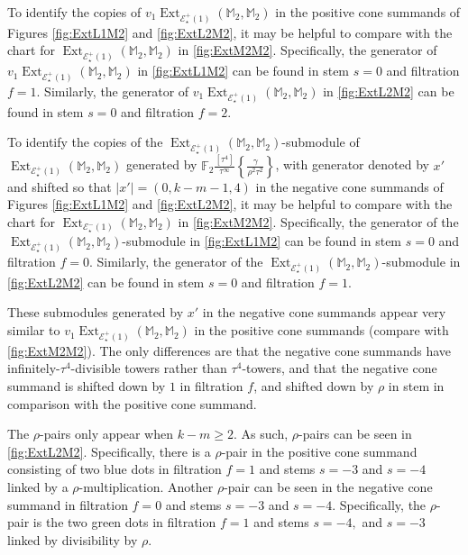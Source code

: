 \documentclass{amsart}
\theoremstyle{plain}
\numberwithin{equation}{section}
\numberwithin{figure}{section}
\DeclareMathOperator{\Ext}{Ext}
\newcommand{\mF}{{\mathbb F}}
\newcommand{\mM}{{\mathbb M}}
\newcommand{\cE}{{\mathcal E}}
\newcommand{\0}{\langle 0 \rangle }
\begin{document}
To identify the copies of $v_{1}\Ext_{\cE^{+}_{\star}(1)}(\mM_{2}, \mM_{2})$ in the positive cone summands of Figures \ref{fig:ExtL1M2} and \ref{fig:ExtL2M2}, it may be helpful to compare with the chart for $\Ext_{\cE^{+}_{\star}(1)}(\mM_{2}, \mM_{2})$ in \cref{fig:ExtM2M2}. Specifically, the generator of $v_{1}\Ext_{\cE^{+}_{\star}(1)}(\mM_{2}, \mM_{2})$ in \cref{fig:ExtL1M2} can be found in stem $s = 0$ and filtration $f = 1.$ Similarly, the generator of $v_{1}\Ext_{\cE^{+}_{\star}(1)}(\mM_{2}, \mM_{2})$ in \cref{fig:ExtL2M2} can be found in stem $s = 0$ and filtration $f = 2$. 

To identify the copies of the $\Ext_{\cE^{+}_{\star}(1)}(\mM_{2}, \mM_{2})$-submodule of $\Ext_{\cE^{+}_{\star}(1)}(\mM_{2}, \mM_{2})$ generated by $\mF_{2}\frac{[\tau^{4}]}{\tau^{\infty}} \left\{ \frac{\gamma}{\rho^{2}\tau^{2}} \right\}$, with generator denoted by $x'$ and shifted so that $|x'| = (0, k-m-1, 4)$ in the negative cone summands of Figures \ref{fig:ExtL1M2} and \ref{fig:ExtL2M2}, it may be helpful to compare with the chart for $\Ext_{\cE^{-}_{\star}(1)}(\mM_{2}, \mM_{2})$ in \cref{fig:ExtM2M2}. Specifically, the generator of the $\Ext_{\cE^{+}_{\star}(1)}(\mM_{2}, \mM_{2})$-submodule in \cref{fig:ExtL1M2} can be found in stem $s = 0$ and filtration $f = 0$. Similarly, the generator of the $\Ext_{\cE^{+}_{\star}(1)}(\mM_{2}, \mM_{2})$-submodule in \cref{fig:ExtL2M2} can be found in stem $s = 0$ and filtration $f = 1.$ 

These submodules generated by $x'$ in the negative cone summands appear very similar to $v_{1}\Ext_{\cE^{+}_{\star}(1)}(\mM_{2}, \mM_{2})$ in the positive cone summands (compare with \cref{fig:ExtM2M2}). The only differences are that the negative cone summands have infinitely-$\tau^{4}$-divisible towers rather than $\tau^{4}$-towers, and that the negative cone summand is shifted down by $1$ in filtration $f$, and shifted down by $\rho$ in stem in comparison with the positive cone summand. 

The $\rho$-pairs only appear when $k - m \geq 2.$ As such, $\rho$-pairs can be seen in  \cref{fig:ExtL2M2}. Specifically, there is a $\rho$-pair in the positive cone summand consisting of two blue dots in filtration $f = 1$ and stems $s = -3$ and $s = -4$ linked by a $\rho$-multiplication. Another $\rho$-pair can be seen in the negative cone summand in filtration $f=0$ and stems $s = -3$ and $s = -4$. Specifically, the $\rho$-pair is the two green dots in filtration $f = 1$ and stems $s = -4,$ and $s = -3$ linked by divisibility by $\rho.$
\end{document}
